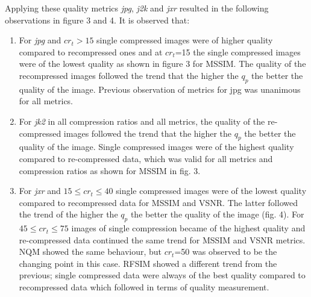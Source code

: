 \documentclass[10pt,twocolumn,letterpaper]{article}
\begin{document}
Applying these quality metrics \emph{jpg}, \emph{j2k} and \emph{jxr} resulted in the following observations in figure 3 and 4. It is observed that:
\begin{enumerate}
	\item For \emph{jpg} and $cr_t>15 $ single compressed images were of higher quality compared to recompressed ones and
		 at $cr_t$=15 the single compressed images were of the lowest quality as shown in figure 3 for MSSIM.
		 The quality of the recompressed images followed the trend that the higher the $q_p$ the better the quality of the image. Previous observation of metrics for jpg was unanimous for all metrics.
	
	\item For \emph{jk2} in all compression ratios and all metrics, the quality of the re-compressed images followed the trend that the higher the $q_p$ the better the quality of the image. Single compressed images were of the highest quality compared to re-compressed data, which was valid for all metrics and compression ratios as shown for MSSIM in fig. 3.
			  
	
		\item For \emph{jxr} and $15\leq{cr_t}\leq{40}$ single compressed images were of the lowest quality compared to recompressed data for MSSIM and VSNR. The latter followed the trend of the higher the $q_p$ the better the quality of the image (fig. 4).	 
        For $45\leq{cr_t}\leq{75}$ images of single compression became of the highest quality and  re-compressed data continued the same trend for MSSIM and VSNR metrics.
        NQM showed the same behaviour, but ${cr_t}$=50 was observed to be the changing point in this case. RFSIM showed a different trend from the previous; single compressed data were always of the best quality compared to recompressed data which followed in terms of quality measurement. 
   
   
   
\end{enumerate}
\end{document}
